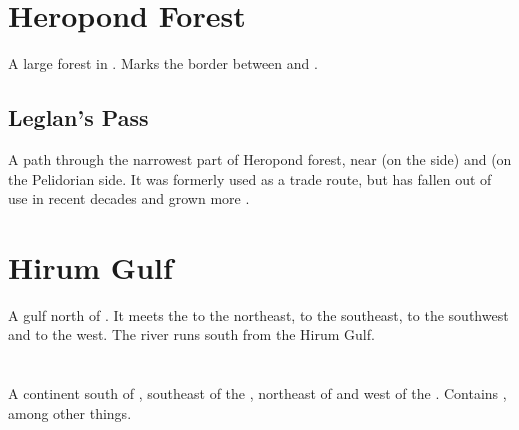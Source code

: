 \section{Heropond Forest}
A large \Wylde{} forest in . Marks the border between  and . 









\subsection{Leglan's Pass}
A path through the narrowest part of Heropond forest, near  (on the \Scyric{} side) and \Redglen{} (on the Pelidorian side. 
It was formerly used as a trade route, but has fallen out of use in recent decades and grown more . 















\section{Hirum Gulf}
A gulf north of . 
It meets the  to the northeast,  to the southeast,  to the southwest and  to the west. 
The river  runs south from the Hirum Gulf. 















\section{\Durcaccontinent}
\index{\Durcaccontinent}
A continent south of , southeast of the , northeast of  and west of the . 
Contains , among other things. 
















